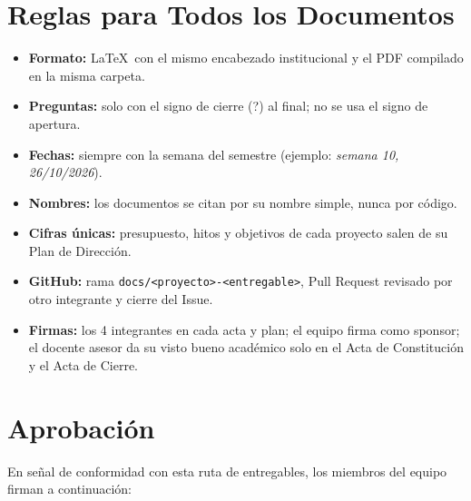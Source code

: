 \documentclass[11pt,a4paper]{article}
\begin{document}
\section{Reglas para Todos los Documentos}
\begin{itemize}[leftmargin=*]
    \item \textbf{Formato:} \LaTeX\ con el mismo encabezado institucional y el PDF compilado en la misma carpeta.
    \item \textbf{Preguntas:} solo con el signo de cierre (?) al final; no se usa el signo de apertura.
    \item \textbf{Fechas:} siempre con la semana del semestre (ejemplo: \textit{semana 10, 26/10/2026}).
    \item \textbf{Nombres:} los documentos se citan por su nombre simple, nunca por código.
    \item \textbf{Cifras únicas:} presupuesto, hitos y objetivos de cada proyecto salen de su Plan de Dirección.
    \item \textbf{GitHub:} rama \texttt{docs/<proyecto>-<entregable>}, Pull Request revisado por otro integrante y cierre del Issue.
    \item \textbf{Firmas:} los 4 integrantes en cada acta y plan; el equipo firma como sponsor; el docente asesor da su visto bueno académico solo en el Acta de Constitución y el Acta de Cierre.
\end{itemize}

\section{Aprobación}
\noindent En señal de conformidad con esta ruta de entregables, los miembros del equipo firman a continuación:

\vspace{1.5cm}
\end{document}
